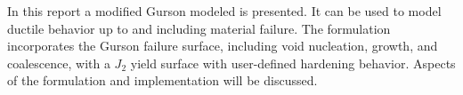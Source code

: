 In this report a modified Gurson modeled is presented. It can be used
to model ductile behavior up to and including material failure. The
formulation incorporates the Gurson failure surface, including void
nucleation, growth, and coalescence, with a $J_2$ yield surface with
user-defined hardening behavior. Aspects of the formulation and
implementation will be discussed.

